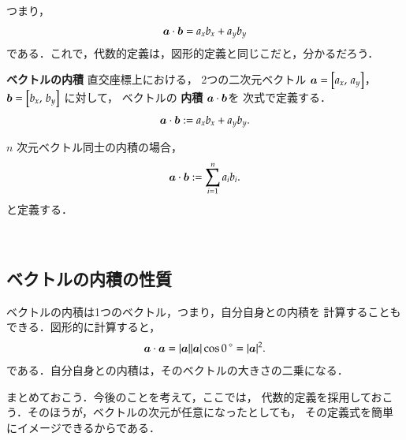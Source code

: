                 つまり，
                    \begin{align}
                         \boldsymbol{a}\cdot\boldsymbol{b} = a_{x}b_{x} + a_{y}b_{y}
                    \end{align}
                である．これで，代数的定義は，図形的定義と同じこだと，分かるだろう．
                    \\
                    \begin{itembox}[l]{\textbf{ベクトルの内積}}
                        直交座標上における，
                        2つの二次元ベクトル $\boldsymbol{a} = \left[a_{x} ,\,a_{y}\right]$，
                        $\boldsymbol{b} = \left[b_{x} ,\,b_{y}\right]$ に対して，
                        ベクトルの \textbf{内積} $\boldsymbol{a}\cdot\boldsymbol{b}$を
                        次式で定義する．
                            \begin{align}
                                \boldsymbol{a} \cdot \boldsymbol{b} := a_{x}b_{x} + a_{y}b_{y}.
                            \end{align}

                        $n$ 次元ベクトル同士の内積の場合，
                            \begin{align}
                                \boldsymbol{a} \cdot \boldsymbol{b} := \sum_{i=1}^{n}a_{i}b_{i}.
                            \end{align}
                        と定義する．
                    \end{itembox}
                    \\

            \subsection{ベクトルの内積の性質}\label{subsec:VecNaisekiStt}
                ベクトルの内積は1つのベクトル，つまり，自分自身との内積を
                計算することもできる．図形的に計算すると，
                    \begin{align}
                         \boldsymbol{a}\cdot\boldsymbol{a} =|\boldsymbol{a}| |\boldsymbol{a}| \cos{0\,}^{\circ}  = |\boldsymbol{a}|^{2} .
                    \end{align}
                である．自分自身との内積は，そのベクトルの大きさの二乗になる．

                まとめておこう．今後のことを考えて，ここでは，
                代数的定義を採用しておこう．そのほうが，ベクトルの次元が任意になったとしても，
                その定義式を簡単にイメージできるからである．

